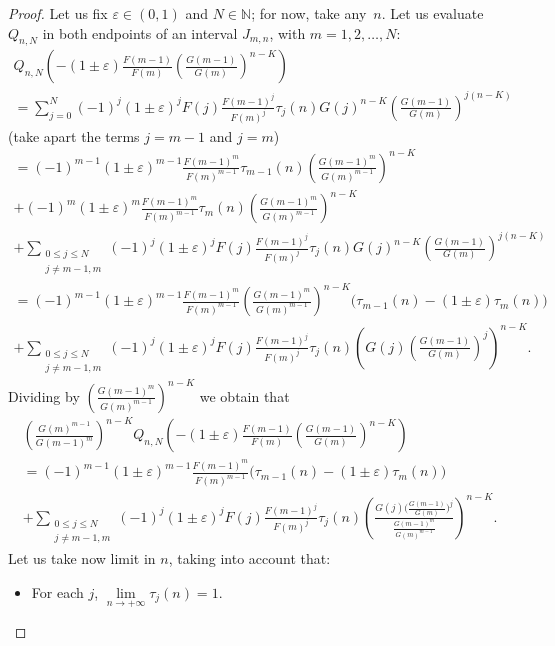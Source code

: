 \documentclass[10pt,a4paper]{amsart}
\newcommand{\NN}{\mathbb{N}}
\newcommand{\eps}{\varepsilon}
\begin{document}
\begin{proof}
Let us fix $\eps \in (0,1)$ and $N \in \NN$; for now, take any~$n$. Let us evaluate $Q_{n,N}$ in both endpoints of an interval $J_{m,n}$, with $m=1,2,\dots,N$:
\begin{multline*}
  Q_{n,N}\left( -(1\pm \eps) \tfrac{F(m-1)}{F(m)} \left( \tfrac{G(m-1)}{G(m)} \right)^{n-K} \right)
  \\
  = \sum_{j=0}^N (-1)^j (1\pm \eps)^j F(j) \tfrac{F(m-1)^j}{F(m)^j}
  \tau_j(n) G(j)^{n-K} \left( \tfrac{G(m-1)}{G(m)} \right)^{j(n-K)}
\end{multline*}
(take apart the terms $j=m-1$ and $j=m$)
\begin{multline*}
  = (-1)^{m-1} (1\pm \eps)^{m-1} \tfrac{F(m-1)^m}{F(m)^{m-1}}
  \tau_{m-1}(n) \left( \tfrac{G(m-1)^m}{G(m)^{m-1}} \right)^{n-K}
  \\
  + (-1)^m (1\pm \eps)^m \tfrac{F(m-1)^m}{F(m)^{m-1}}
  \tau_m(n) \left( \tfrac{G(m-1)^m}{G(m)^{m-1}} \right)^{n-K}
  \\
  + \sum_{\substack{0 \le j \le N \\ j\ne m-1, m}} (-1)^j (1\pm \eps)^j F(j) \tfrac{F(m-1)^j}{F(m)^j}
  \tau_j(n) G(j)^{n-K} \left( \tfrac{G(m-1)}{G(m)} \right)^{j(n-K)}
\\
  = (-1)^{m-1} (1\pm \eps)^{m-1} \tfrac{F(m-1)^m}{F(m)^{m-1}}
  \left( \tfrac{G(m-1)^m}{G(m)^{m-1}} \right)^{n-K}
  \big( \tau_{m-1}(n) - (1 \pm \eps) \tau_m(n) \big)
  \\
  + \sum_{\substack{0 \le j \le N \\ j\ne m-1, m}} (-1)^j (1\pm \eps)^j F(j) \tfrac{F(m-1)^j}{F(m)^j}
  \tau_j(n) \left( G(j) \left(\tfrac{G(m-1)}{G(m)}\right)^j \right)^{n-K}.
\end{multline*}
Dividing by $\left( \tfrac{G(m-1)^m}{G(m)^{m-1}} \right)^{n-K}$ we obtain that
\begin{multline*}
  \left( \tfrac{G(m)^{m-1}}{G(m-1)^m} \right)^{n-K} 
  Q_{n,N}\left( -(1\pm \eps) \tfrac{F(m-1)}{F(m)} \left( \tfrac{G(m-1)}{G(m)} \right)^{n-K} \right)
  \\
  = (-1)^{m-1} (1\pm \eps)^{m-1} \tfrac{F(m-1)^m}{F(m)^{m-1}}
  \big( \tau_{m-1}(n) - (1 \pm \eps) \tau_m(n) \big)
  \\
  + \sum_{\substack{0 \le j \le N \\ j\ne m-1, m}} (-1)^j 
  (1\pm \eps)^j F(j) \tfrac{F(m-1)^j}{F(m)^j}
  \tau_j(n) \left(
  \frac{G(j) \Big(\tfrac{G(m-1)}{G(m)}\Big)^j}
  {\tfrac{G(m-1)^m}{G(m)^{m-1}}}
  \right)^{n-K}.
\end{multline*}
Let us take now limit in $n$, taking into account that:
\begin{itemize}
\item For each $j$, $\lim\limits_{n\to +\infty} \tau_j(n) = 1$.


\end{itemize}
\end{proof}
\end{document}
